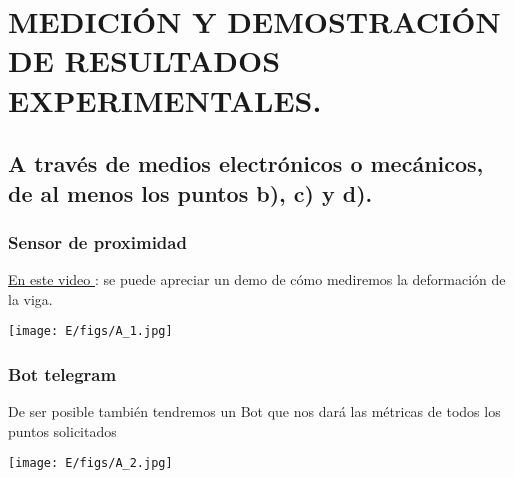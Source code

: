 
\chapter{MEDICIÓN Y DEMOSTRACIÓN DE RESULTADOS EXPERIMENTALES.}

\section{A través de medios electrónicos o mecánicos, de al menos los puntos b), c) y d).
}

\subsection{Sensor de proximidad}
\href{https://youtu.be/l9V6qCGNVYA}{En este video } \textrm{: se puede apreciar un demo de cómo mediremos la deformación de la viga.}
\bigskip
\bigskip
\begin{center}
\texttt{[image: E/figs/A\_1.jpg]} 
\end{center}
\bigskip
\bigskip
\bigskip
\bigskip
\bigskip

\subsection{Bot telegram}
\textrm{ De ser posible también tendremos un Bot que nos dará las métricas de todos los puntos solicitados}

\begin{center}
\texttt{[image: E/figs/A\_2.jpg]} 
\end{center}